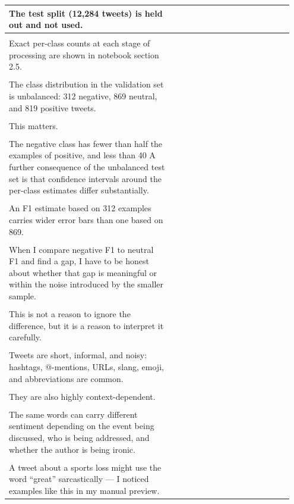 \documentclass[11pt]{article}
\begin{document}
\begin{longtable}{|p{0.55\linewidth}|p{0.40\linewidth}|}
\hline
The test split (12,284 tweets) is held out and not used. & \\[2pt]
\hline
\rule{0pt}{3.5cm} & \\
\hline
Exact per-class counts at each stage of processing are shown in notebook section 2.5. & \\[2pt]
\hline
\rule{0pt}{3.5cm} & \\
\hline
The class distribution in the validation set is unbalanced: 312 negative, 869 neutral, and 819 positive tweets. & \\[2pt]
\hline
\rule{0pt}{3.5cm} & \\
\hline
This matters. & \\[2pt]
\hline
\rule{0pt}{3.5cm} & \\
\hline
The negative class has fewer than half the examples of positive, and less than 40 A further consequence of the unbalanced test set is that confidence intervals around the per-class estimates differ substantially. & \\[2pt]
\hline
\rule{0pt}{3.5cm} & \\
\hline
An F1 estimate based on 312 examples carries wider error bars than one based on 869. & \\[2pt]
\hline
\rule{0pt}{3.5cm} & \\
\hline
When I compare negative F1 to neutral F1 and find a gap, I have to be honest about whether that gap is meaningful or within the noise introduced by the smaller sample. & \\[2pt]
\hline
\rule{0pt}{3.5cm} & \\
\hline
This is not a reason to ignore the difference, but it is a reason to interpret it carefully. & \\[2pt]
\hline
\rule{0pt}{3.5cm} & \\
\hline
Tweets are short, informal, and noisy: hashtags, @-mentions, URLs, slang, emoji, and abbreviations are common. & \\[2pt]
\hline
\rule{0pt}{3.5cm} & \\
\hline
They are also highly context-dependent. & \\[2pt]
\hline
\rule{0pt}{3.5cm} & \\
\hline
The same words can carry different sentiment depending on the event being discussed, who is being addressed, and whether the author is being ironic. & \\[2pt]
\hline
\rule{0pt}{3.5cm} & \\
\hline
A tweet about a sports loss might use the word ``great'' sarcastically --- I noticed examples like this in my manual preview. & \\[2pt]

\end{longtable}
\end{document}
